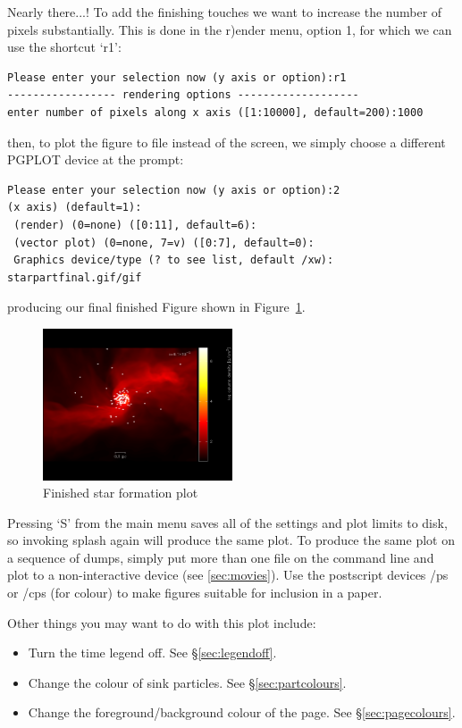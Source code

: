 \documentclass[a4paper,11pt]{article}
\begin{document}
 Nearly there...! To add the finishing touches we want to increase the number of pixels substantially. This is done in the r)ender menu, option 1, for which we can use the shortcut `r1':
\begin{verbatim}
Please enter your selection now (y axis or option):r1
----------------- rendering options -------------------
enter number of pixels along x axis ([1:10000], default=200):1000
\end{verbatim}
then, to plot the figure to file instead of the screen, we simply choose a different PGPLOT device at the prompt:
\begin{verbatim}
Please enter your selection now (y axis or option):2
(x axis) (default=1):
 (render) (0=none) ([0:11], default=6):
 (vector plot) (0=none, 7=v) ([0:7], default=0):
 Graphics device/type (? to see list, default /xw): starpartfinal.gif/gif
\end{verbatim}
producing our final finished Figure shown in Figure~\ref{fig:starfinal}.
\begin{figure}[h!]
\begin{center}
\includegraphics[width=0.5\textwidth]{starpartfinal.png}
\caption{Finished star formation plot}
\label{fig:starfinal}
\end{center}
\end{figure}

 Pressing `S' from the main menu saves all of the settings and plot limits to disk, so invoking splash again will produce the same plot. To produce the same plot on a sequence of dumps, simply put more than one file on the command line and plot to a non-interactive device (see \ref{sec:movies}). Use the postscript devices /ps or /cps (for colour) to make figures suitable for inclusion in a paper.

Other things you may want to do with this plot include:
\begin{itemize}
\item Turn the time legend off. See \S\ref{sec:legendoff}.
\item Change the colour of sink particles. See \S\ref{sec:partcolours}.
\item Change the foreground/background colour of the page. See \S\ref{sec:pagecolours}.
\end{itemize}
\end{document}
